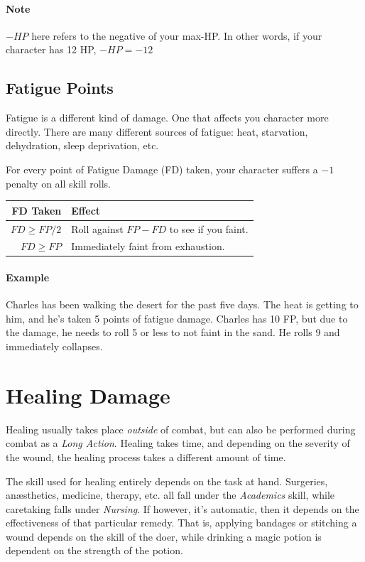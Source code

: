 \paragraph{Note} $-HP$ here refers to the negative of your max-HP.
In other words, if your character has 12 HP, $-HP = -12$
  
\subsection{Fatigue Points}
Fatigue is a different kind of damage.
One that affects you character more directly.
There are many different sources of fatigue: heat, starvation, dehydration, sleep deprivation, etc.

For every point of Fatigue Damage (FD) taken, your character suffers a $-1$ penalty on all skill rolls.

\begin{center}
  \begin{tabular}{r | l}
    \textbf{FD Taken} & \textbf{Effect} \\\hline
    $FD \geq FP/2$    & Roll against $FP - FD$ to see if you faint. \\
    $FD \geq FP$      & Immediately faint from exhaustion.
  \end{tabular}
\end{center}

\paragraph{Example} Charles has been walking the desert for the past five days.
The heat is getting to him, and he's taken 5 points of fatigue damage.
Charles has 10 FP, but due to the damage, he needs to roll 5 or less to not faint in the sand.
He rolls 9 and immediately collapses.

\section{Healing Damage}
Healing usually takes place \textit{outside} of combat, but can also be performed during combat as a \textit{Long Action}.
Healing takes time, and depending on the severity of the wound, the healing process takes a different amount of time.

The skill used for healing entirely depends on the task at hand.
Surgeries, anæsthetics, medicine, therapy, etc. all fall under the \textit{Academics} skill, while caretaking falls under \textit{Nursing}.
If however, it's automatic, then it depends on the effectiveness of that particular remedy.
That is, applying bandages or stitching a wound depends on the skill of the doer, while drinking a magic potion is dependent on the strength of the potion.

